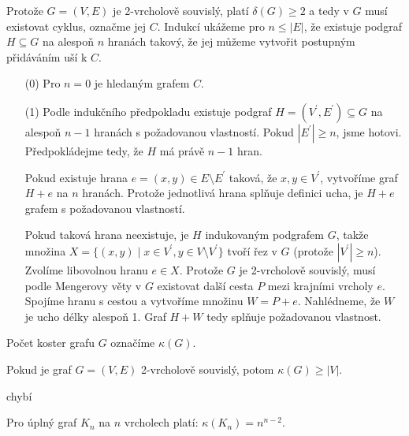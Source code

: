 \begin{t_proof}
  Protože $G=(V,E)$ je 2-vrcholově souvislý, platí $\delta(G)\geq 2$ a tedy v $G$ musí existovat cyklus, označme jej $C$. Indukcí ukážeme pro $n\leq|E|$, že existuje podgraf $H\subseteq G$ na alespoň $n$ hranách takový, že jej můžeme vytvořit postupným přidáváním uší k $C$.
  \begin{enumerate}
    \item[(0)] Pro $n=0$ je hledaným grafem $C$.
    \item[(1)] Podle indukčního předpokladu existuje podgraf $H=(V^\prime,E^\prime)\subseteq G$ na alespoň $n-1$ hranách s požadovanou vlastností. Pokud $|E^\prime|\geq n$, jsme hotovi. Předpokládejme tedy, že $H$ má právě $n-1$ hran.
    
    Pokud existuje hrana $e=(x,y)\in E\setminus E^\prime$ taková, že $x,y\in V^\prime$, vytvoříme graf $H+e$ na $n$ hranách. Protože jednotlivá hrana splňuje definici ucha, je $H+e$ grafem s požadovanou vlastností.
    
    Pokud taková hrana neexistuje, je $H$ indukovaným podgrafem $G$, takže množina $X=\{(x,y)\mid x\in V^\prime, y\in V\setminus V^\prime\}$ tvoří řez v $G$ (protože $|V^\prime|\geq n$). Zvolíme libovolnou hranu $e\in X$. Protože $G$ je 2-vrcholově souvislý, musí podle Mengerovy věty v $G$ existovat další cesta $P$ mezi krajními vrcholy $e$. Spojíme hranu s cestou a vytvoříme množinu $W=P+e$. Nahlédneme, že $W$ je ucho délky alespoň 1. Graf $H+W$ tedy splňuje požadovanou vlastnost.
  \end{enumerate}
\end{t_proof}

\begin{t_definition}
  Počet koster grafu $G$ označíme $\kappa(G)$.
\end{t_definition}

\begin{t_theorem}
  Pokud je graf $G=(V,E)$ 2-vrcholově souvislý, potom $\kappa(G)\geq |V|$.
\end{t_theorem}

\begin{t_proof}
  chybí %
\end{t_proof}

\begin{t_theorem}
  Pro úplný graf $K_n$ na $n$ vrcholech platí: $\kappa(K_n)=n^{n-2}$.
\end{t_theorem}

